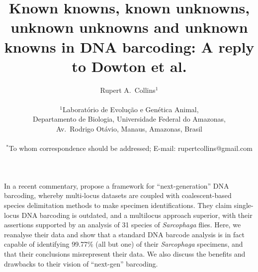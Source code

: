 \documentclass[12pt]{article}
\title{\bf Known knowns, known unknowns, unknown unknowns and unknown knowns in DNA barcoding: A reply to Dowton et al.}
\author
{Rupert A.\ Collins$^{1}$\\
\\
\normalsize{$^{1}$Laborat\'orio de Evolu\c c\~ao e Gen\'etica Animal,}\\
\normalsize{Departamento de Biologia, Universidade Federal do Amazonas,}\\
\normalsize{Av.\ Rodrigo Ot\'avio, Manaus, Amazonas, Brasil}\\
\\
\normalsize{$^\ast$To whom correspondence should be addressed; E-mail:  rupertcollins@gmail.com}
}
\date{}
\newenvironment{sciabstract}{%
\begin{quote} }
{\end{quote}}
\begin{document}
 
\maketitle 



%
%
%
%
%

In a recent commentary, \citet{Dowton2014} propose a framework for “next-generation” DNA barcoding, whereby multi-locus datasets are coupled with coalescent-based species delimitation methods to make specimen identifications. They claim single-locus DNA barcoding is outdated, and a multilocus approach superior, with their assertions supported by an analysis of 31 species of \emph{Sarcophaga} flies. Here, we reanalyse their data and show that a standard DNA barcode analysis is in fact capable of identifying 99.77\% (all but one) of their \emph{Sarcophaga} specimens, and that their conclusions misrepresent their data. We also discuss the benefits and drawbacks to their vision of ``next-gen'' barcoding.
\end{document}
